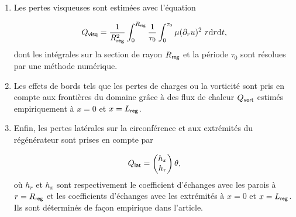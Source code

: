 \begin{enumerate}[label=\textbf{(\roman*)}]
%
%

\item Les pertes visqueuses sont estimées avec l'équation

\begin{equation}
Q_{\sf visq} = \frac{1}{R_{\sf reg}^2} \int_{0}^{R_{\sf reg}} \frac{1}{\tau_0} \int_0^{\tau_0} \mu (\partial_r u)^2\ r \mathrm{d} r \mathrm{d} t,
\label{eq:FluxVisq_Lotton}
\end{equation}
dont les intégrales sur la section de rayon $R_{\sf reg}$ et la période $\tau_0$ sont résolues par une méthode numérique.

\item Les effets de bords tels que les pertes de charges ou la vorticité sont pris en compte aux frontières du domaine grâce à des flux de chaleur $Q_{\sf vort}$ estimés empiriquement à $x=0$ et $x=L_{\sf reg}$.

\item Enfin, les pertes latérales sur la circonférence et aux extrémités du régénérateur sont prises en compte par

\begin{equation}
Q_{\sf lat} = \begin{pmatrix}h_x\\h_r\end{pmatrix} \theta,
\label{eq:FluxLat_Lotton}
\end{equation}
où $h_r$ et $h_x$ sont respectivement le coefficient d'échanges avec les parois à $r = R_{\sf reg}$ et les coefficients d'échanges avec les extrémités à $x=0$ et $x=L_{\sf reg}$. Ils sont déterminés de façon empirique dans l'article.

%
%


\end{enumerate}
